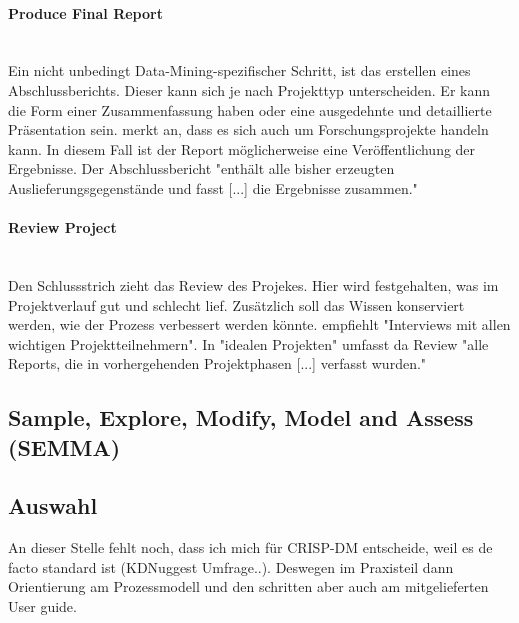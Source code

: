 \paragraph{Produce Final Report}\mbox{} \\
Ein nicht unbedingt Data-Mining-spezifischer Schritt, ist das erstellen eines Abschlussberichts. Dieser kann sich je nach Projekttyp unterscheiden. Er kann die Form einer Zusammenfassung haben oder eine ausgedehnte und detaillierte Präsentation sein. \citep[Punkt 1.4.1.1]{larose_discovering_2014} merkt an, dass es sich auch um Forschungsprojekte handeln kann. In diesem Fall ist der Report möglicherweise  eine Veröffentlichung der Ergebnisse. Der Abschlussbericht "enthält alle bisher erzeugten Auslieferungsgegenstände und fasst [...] die Ergebnisse zusammen."\citep[S~18; eigene Übersetzung]{shearer_crisp-dm_2000}

\paragraph{Review Project}\mbox{} \\
Den Schlussstrich zieht das Review des Projekes. Hier wird festgehalten, was im Projektverlauf gut und schlecht lief. Zusätzlich soll das Wissen konserviert werden, wie der Prozess verbessert werden könnte.   \newline
\citep[S.~18; eigene Übersetzung]{shearer_crisp-dm_2000} empfiehlt "Interviews mit allen wichtigen Projektteilnehmern". In "idealen Projekten" umfasst da Review "alle Reports, die in vorhergehenden Projektphasen [...] verfasst wurden."\citep[S.~29; eigene Übersetzung]{chapman_crisp-dm_2000}







\subsection{Sample, Explore, Modify, Model and Assess (SEMMA)}


\subsection{Auswahl}\label{sec:crispdmdec}
An dieser Stelle fehlt noch, dass ich mich für CRISP-DM entscheide, weil es de facto standard ist (KDNuggest Umfrage..). Deswegen im Praxisteil dann Orientierung am Prozessmodell und den schritten aber auch am mitgelieferten User guide.

